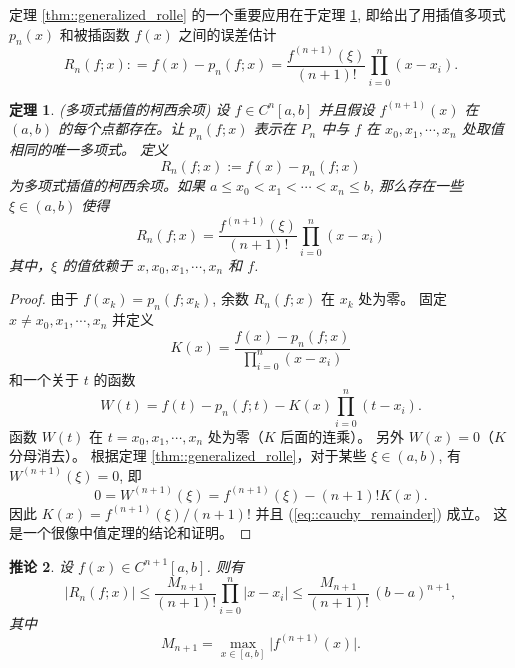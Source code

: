 \documentclass[a4paper]{ctexart}
\newtheorem{theorem}{定理}
\newtheorem{corollary}[theorem]{推论}
\numberwithin{theorem}{section}
\numberwithin{equation}{section}
\numberwithin{figure}{section}
\numberwithin{remark}{section}
\begin{document}
定理 \ref{thm::generalized_rolle} 的一个重要应用在于定理 \ref{thm::cauchy_remainder}, 
即给出了用插值多项式 $p_n(x)$ 和被插函数 $f(x)$ 之间的误差估计
$$
R_n(f; x) : = f(x) - p_n(f; x)
= \frac{f^{(n + 1)}(\xi)}{(n + 1)!} \prod_{i = 0}^n (x - x_i).
$$

\begin{theorem}
    \label{thm::cauchy_remainder}
(多项式插值的柯西余项) 设 $f \in C^{n} [a, b]$ 并且假设 $f^{(n+1)} (x)$ 
在 $(a, b)$ 的每个点都存在。让 $p_n (f ; x)$ 表示在 $P_n$ 中与 $f$ 
在 $x_0 , x_1 , \cdots , x_n$ 处取值相同的唯一多项式。
定义
\begin{equation}
R_n (f ; x) := f (x) - p_n(f ; x) 
\end{equation}
为多项式插值的柯西余项。如果 $a \leq x_0 < x_1 < \cdots < x_n \leq b$, 
那么存在一些 $\xi \in (a, b)$ 使得
\begin{equation}
    \label{eq::cauchy_remainder}
R_n (f ; x) = \frac{f^{(n+1)}(\xi)}{(n + 1)!} \prod_{i=0}^{n} (x - x_i) 
\end{equation}
其中，$\xi$ 的值依赖于 $x, x_0 , x_1 , \cdots , x_n$ 和 $f$.
\end{theorem}

\begin{proof}
由于 $f (x_k ) = p_n (f ; x_k )$, 余数 $R_n (f ; x)$ 在 $x_k$ 处为零。
固定 $x \neq x_0, x_1 , \cdots , x_n$ 并定义
\[
K(x) = \frac{f (x) - p_n (f ; x)}{\prod_{i=0}^{n} (x - x_i)}
\]
和一个关于 $t$ 的函数
\[
W (t) = f (t) - p_n (f ; t) - K(x) \prod_{i=0}^{n} (t - x_i).
\]
函数 $W (t)$ 在 $t = x_0, x_1, \cdots , x_n$ 处为零（$K$ 后面的连乘）。
另外 $W (x) = 0$（$K$ 分母消去）。
根据定理 \ref{thm::generalized_rolle}，对于某些 $\xi \in (a, b)$, 
有 $W^{(n+1)} (\xi) = 0$, 即
\[
0 = W^{(n+1)} (\xi) = f^{(n+1)}(\xi) - (n + 1)!K(x).
\]
因此 $K(x) = f^{(n+1)} (\xi)/(n + 1)!$ 并且 (\ref{eq::cauchy_remainder}) 成立。
这是一个很像中值定理的结论和证明。
\end{proof}

\begin{corollary}
    \label{cor::cauchy_remainder}
设 $f(x)\in C^{n+1}[a, b]$. 则有
\begin{equation}
\lvert R_n(f;x)\rvert
\le \frac{M_{n+1}}{(n+1)!}\prod_{i=0}^{n}\lvert x-x_i\rvert
\le \frac{M_{n+1}}{(n+1)!}\,(b-a)^{n+1},
\end{equation}
其中
\begin{equation*}
M_{n+1}=\max_{x\in[a,b]}\bigl\lvert f^{(n+1)}(x)\bigr\rvert .
\end{equation*}
\end{corollary}
\end{document}

